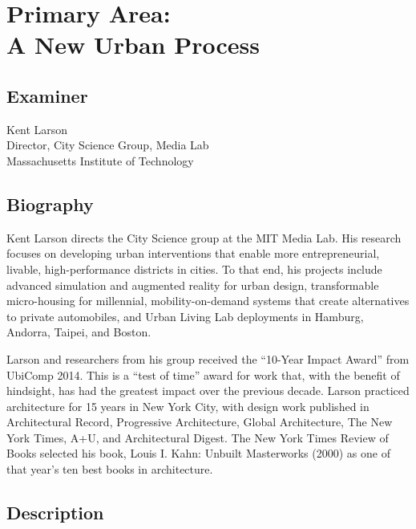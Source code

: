\section*{Primary Area:\\
A New Urban Process}
% 
\subsection*{Examiner} 
Kent Larson\\
Director, City Science Group, Media Lab
\\
Massachusetts Institute of Technology
\subsection*{Biography}
Kent Larson directs the City Science group at the MIT Media Lab. His research focuses on developing urban interventions that enable more entrepreneurial, livable, high-performance districts in cities. To that end, his projects include advanced simulation and augmented reality for urban design, transformable micro-housing for millennial, mobility-on-demand systems that create alternatives to private automobiles, and Urban Living Lab deployments in Hamburg, Andorra, Taipei, and Boston.\par
Larson and researchers from his group received the “10-Year Impact Award” from UbiComp 2014. This is a “test of time” award for work that, with the benefit of hindsight, has had the greatest impact over the previous decade. Larson practiced architecture for 15 years in New York City, with design work published in Architectural Record, Progressive Architecture, Global Architecture, The New York Times, A+U, and Architectural Digest. The New York Times Review of Books selected his book, Louis I. Kahn: Unbuilt Masterworks (2000) as one of that year’s ten best books in architecture.
% 
\subsection*{Description}

